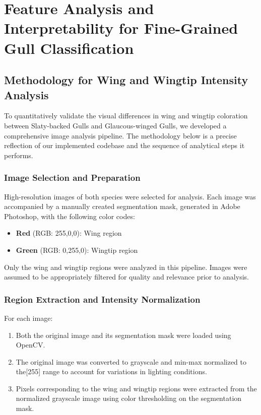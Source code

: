 \documentclass[a4paper,12pt]{article}
\begin{document}
\section{Feature Analysis and Interpretability for Fine-Grained Gull Classification}

\subsection{Methodology for Wing and Wingtip Intensity Analysis}

To quantitatively validate the visual differences in wing and wingtip coloration between Slaty-backed Gulls and Glaucous-winged Gulls, we developed a comprehensive image analysis pipeline. The methodology below is a precise reflection of our implemented codebase and the sequence of analytical steps it performs.

\subsubsection{Image Selection and Preparation}

High-resolution images of both species were selected for analysis. Each image was accompanied by a manually created segmentation mask, generated in Adobe Photoshop, with the following color codes:
\begin{itemize}
    \item \textbf{Red} (RGB: 255,0,0): Wing region
    \item \textbf{Green} (RGB: 0,255,0): Wingtip region
\end{itemize}
Only the wing and wingtip regions were analyzed in this pipeline. Images were assumed to be appropriately filtered for quality and relevance prior to analysis.

\subsubsection{Region Extraction and Intensity Normalization}

For each image:
\begin{enumerate}
    \item Both the original image and its segmentation mask were loaded using OpenCV.
    \item The original image was converted to grayscale and min-max normalized to the[255] range to account for variations in lighting conditions.
    \item Pixels corresponding to the wing and wingtip regions were extracted from the normalized grayscale image using color thresholding on the segmentation mask.
\end{enumerate}
\end{document}
